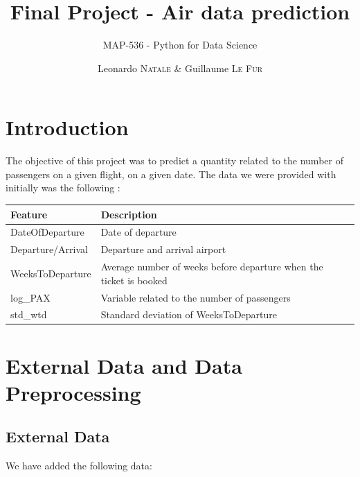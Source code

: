 \documentclass[a4paper,12pt,twoside]{article}
\subtitle{MAP-536 - Python for Data Science}
\title{Final Project - Air data prediction}
\author{Leonardo \textsc{Natale} \& Guillaume \textsc{Le Fur}}
\begin{document}
\maketitle

\section{Introduction}

The objective of this project was to predict a quantity related to the number of passengers on a given flight, on a given date. The data we were provided with initially was the following :

\begin{table}[H]
	\centering
	\begin{tabular}{|l|l|}
	\hline
	\textbf{Feature} & \textbf{Description}                          \\ \hline
	DateOfDeparture  & Date of departure                             \\ \hline
	Departure/Arrival& Departure and arrival airport                 \\ \hline
	WeeksToDeparture & Average number of weeks before departure when the ticket is booked \\ \hline
	log\_PAX          & Variable related to the number of passengers \\ \hline
	std\_wtd          & Standard deviation of WeeksToDeparture       \\ \hline
	\end{tabular}
	\label{table:orig_data}
\end{table}

\section{External Data and Data Preprocessing}

\subsection{External Data}

We have added the following data:
\end{document}
